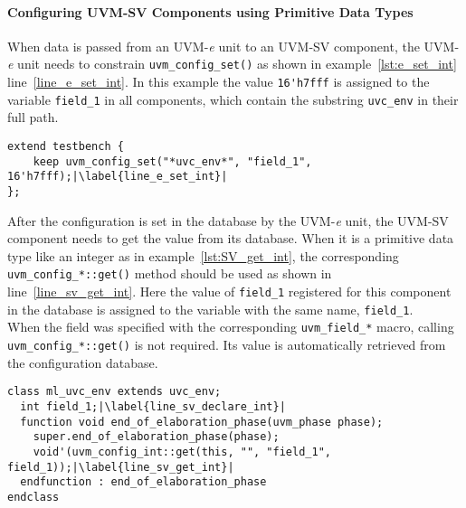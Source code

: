 \paragraph{Configuring UVM-SV Components using Primitive Data Types}\label{config_sv_primitive}

When data is passed from an UVM-\textit{e} unit to an UVM-SV component,
the UVM-\textit{e} unit needs to constrain \lstinline$uvm_config_set()$ as shown in example~\ref{lst:e_set_int}
line~\ref{line_e_set_int}. In this example the value \lstinline$16'h7fff$ is assigned to the variable
\lstinline$field_1$ in all components, which contain the substring \lstinline$uvc_env$ in their full path.

\lstset{language=e, numbers = left, escapechar=|, breaklines=true}
\begin{lstlisting}[frame=htrbl, caption={\textit{e}: register an integer in configuration database},
label={lst:e_set_int}]
extend testbench {
    keep uvm_config_set("*uvc_env*", "field_1", 16'h7fff);|\label{line_e_set_int}|
};
\end{lstlisting}

After the configuration is set in the database by the UVM-\textit{e} unit, the UVM-SV component needs to get
the value from its database. When it is a primitive data type like an integer as in example~\ref{lst:SV_get_int},
the corresponding \lstinline$uvm_config_*::get()$ method should be used as shown in line~\ref{line_sv_get_int}. Here the
value of \lstinline$field_1$ registered for this component in the database is assigned to the variable with the same
name, \lstinline$field_1$.\\
When the field was specified with the corresponding \lstinline$uvm_field_*$ macro, calling
\lstinline$uvm_config_*::get()$ is not required. Its value is automatically retrieved from the configuration database.

\lstset{language=SystemVerilog, numbers = left, escapechar=|, breaklines=true}
\begin{lstlisting}[frame=htrbl, caption={SystemVerilog: getting an integer from configuration database},
label={lst:SV_get_int}]
class ml_uvc_env extends uvc_env;
  int field_1;|\label{line_sv_declare_int}|
  function void end_of_elaboration_phase(uvm_phase phase);
  	super.end_of_elaboration_phase(phase);
    void'(uvm_config_int::get(this, "", "field_1", field_1));|\label{line_sv_get_int}|
  endfunction : end_of_elaboration_phase
endclass
\end{lstlisting}

